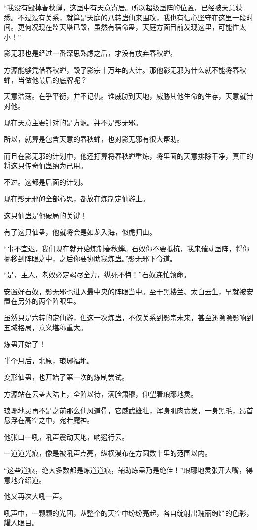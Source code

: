 \begin{this_body}
“我没有毁掉春秋蝉，这蛊中有天意寄居。所以超级蛊阵的位置，已经被天意获悉。不过没有关系，就算是天庭的八转蛊仙来围攻，我也有信心坚守在这里一段时间。更何况现在监天塔已毁，虽然有宿命蛊，天庭方面目前发现这里，可能性太小！”

影无邪也是经过一番深思熟虑之后，才没有放弃春秋蝉。

方源能够凭借春秋蝉，毁了影宗十万年的大计。那他影无邪为什么就不能将春秋蝉，当做他最后的底牌呢？

天意浩荡。在乎平衡，并不记仇。谁威胁到天地，威胁其他生命的生存，天意就针对他。

现在天意主要针对的是方源。并不是影无邪。

所以，就算是包含天意的春秋蝉，也对影无邪有很大帮助。

而且在影无邪的计划中，他还打算将春秋蝉重炼，将里面的天意排除干净，真正的将这只传奇仙蛊纳为己用。

不过。这都是后面的计划。

现在影无邪的全部心思，都放在炼制定仙游上。

这只仙蛊是他破局的关键！

有了这只仙蛊，他就将会是如龙入海，似虎归山。

“事不宜迟，我们现在就开始炼制春秋蝉。石奴你不要抵抗，我来催动蛊阵，将你挪移到阵眼之中，之后你要协助我炼蛊。”影无邪下令道。

“是，主人，老奴必定竭尽全力，纵死不悔！”石奴连忙领命。

安置好石奴，影无邪也进入最中央的阵眼当中。至于黑楼兰、太白云生，早就被安置在另外的两个阵眼里。

虽然只是六转的定仙游，但这一次炼蛊，不仅关系到影宗未来，甚至还隐隐影响到五域格局，意义堪称重大。

炼蛊开始了！

半个月后，北原，琅琊福地。

变形仙蛊，也开始了第一次的炼制尝试。

方源站在云盖大陆上，全阵以待，满脸肃穆，仰望着琅琊地灵。

琅琊地灵再不是之前那么仙风道骨，它威武雄壮，浑身肌肉贲发，一身黑毛，昂首悬浮在高空之中，宛若魔神。

他张口一吼，吼声震动天地，响遏行云。

一道道光痕，像是被吼声点亮，纵横漫布在方圆数十里的范围以内。

“这些道痕，绝大多数都是炼道道痕，辅助炼蛊乃是绝佳！”琅琊地灵张开大嘴，得意地介绍道。

他又再次大吼一声。

吼声中，一颗颗的光团，从整个的天空中纷纷亮起，各自绽射出瑰丽绚烂的色彩，耀人眼目。


\end{this_body}

